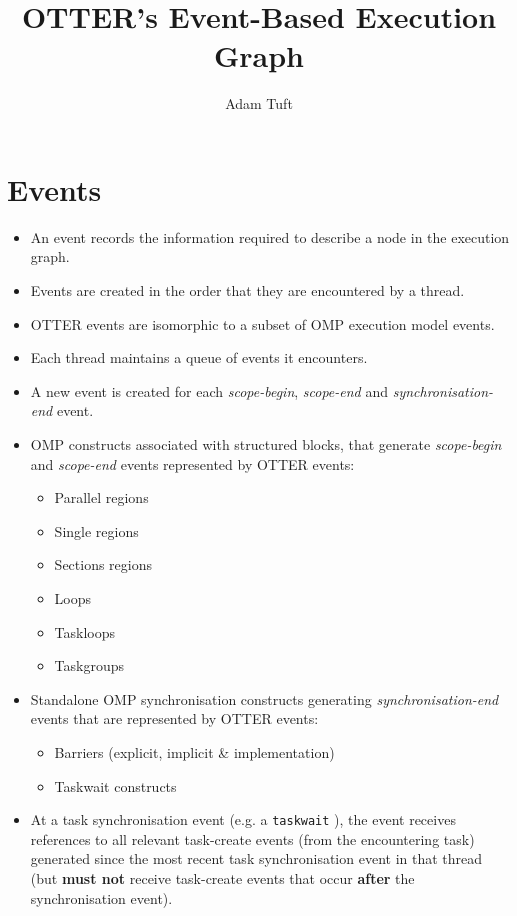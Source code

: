 \documentclass[11pt,a4paper]{article}
\title{OTTER's Event-Based Execution Graph}
\newcommand{\code}[1]{\texttt{#1} }
\begin{document}
\author{Adam Tuft}
\maketitle

\section{Events}

\begin{itemize}
\item An event records the information required to describe a node in the execution graph.
\item Events are created in the order that they are encountered by a thread.
\item OTTER events are isomorphic to a subset of OMP execution model events.
\item Each thread maintains a queue of events it encounters.
\item A new event is created for each \emph{scope-begin}, \emph{scope-end} and \emph{synchronisation-end} event.
\item OMP constructs associated with structured blocks, that generate \emph{scope-begin} and \emph{scope-end} events represented by OTTER events:
\begin{itemize}
\item Parallel regions
\item Single regions
\item Sections regions
\item Loops
\item Taskloops
\item Taskgroups
\end{itemize}
\item Standalone OMP synchronisation constructs generating \emph{synchronisation-end} events that are represented by OTTER events:
\begin{itemize}
\item Barriers (explicit, implicit \& implementation)
\item Taskwait constructs
\end{itemize}
\item At a task synchronisation event (e.g. a \code{taskwait}), the event receives references to all relevant task-create events (from the encountering task) generated since the most recent task synchronisation event in that thread (but \textbf{must not} receive task-create events that occur \textbf{after} the synchronisation event).
\end{itemize}
\end{document}
